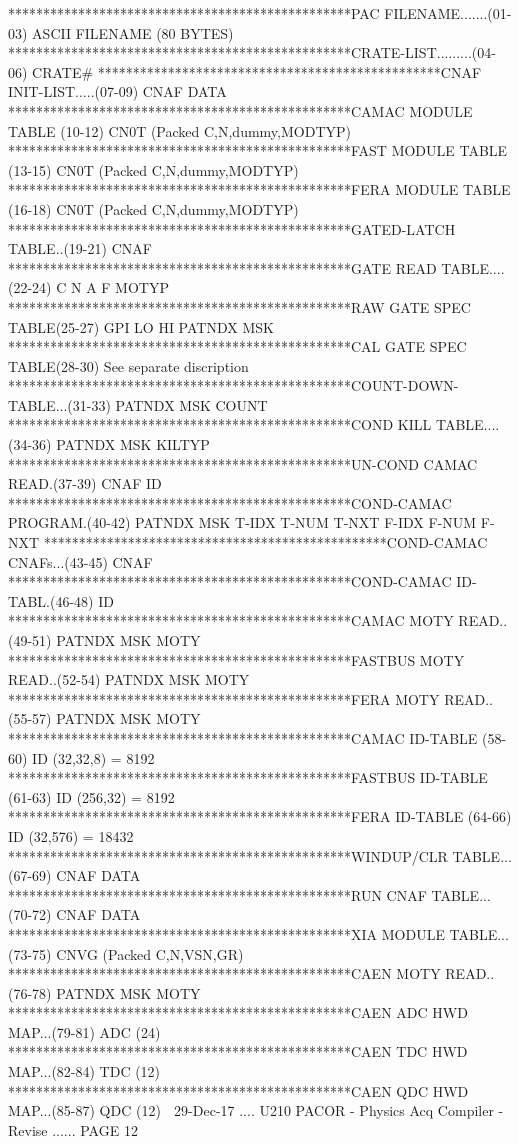    *************************************************PAC FILENAME.......(01-03)
   ASCII FILENAME (80 BYTES)
   *************************************************CRATE-LIST.........(04-06)
   CRATE#
   *************************************************CNAF INIT-LIST.....(07-09)
   CNAF DATA
   *************************************************CAMAC MODULE TABLE (10-12)
   CN0T           (Packed C,N,dummy,MODTYP)
   *************************************************FAST  MODULE TABLE (13-15)
   CN0T           (Packed C,N,dummy,MODTYP)
   *************************************************FERA  MODULE TABLE (16-18)
   CN0T           (Packed C,N,dummy,MODTYP)
   *************************************************GATED-LATCH TABLE..(19-21)
   CNAF
   *************************************************GATE READ TABLE....(22-24)
   C N A F MOTYP
   *************************************************RAW GATE SPEC TABLE(25-27)
   GPI LO HI PATNDX MSK
   *************************************************CAL GATE SPEC TABLE(28-30)
   See separate discription
   *************************************************COUNT-DOWN-TABLE...(31-33)
   PATNDX MSK COUNT
   *************************************************COND KILL TABLE....(34-36)
   PATNDX MSK KILTYP
   *************************************************UN-COND CAMAC READ.(37-39)
   CNAF   ID
   *************************************************COND-CAMAC PROGRAM.(40-42)
   PATNDX MSK T-IDX T-NUM T-NXT F-IDX F-NUM F-NXT
   *************************************************COND-CAMAC CNAFs...(43-45)
   CNAF
   *************************************************COND-CAMAC ID-TABL.(46-48)
   ID
   *************************************************CAMAC   MOTY READ..(49-51)
   PATNDX MSK MOTY
   *************************************************FASTBUS MOTY READ..(52-54)
   PATNDX MSK MOTY
   *************************************************FERA    MOTY READ..(55-57)
   PATNDX MSK MOTY
   *************************************************CAMAC     ID-TABLE (58-60)
   ID (32,32,8) = 8192
   *************************************************FASTBUS   ID-TABLE (61-63)
   ID (256,32)  = 8192
   *************************************************FERA      ID-TABLE (64-66)
   ID (32,576)  = 18432
   *************************************************WINDUP/CLR TABLE...(67-69)
   CNAF DATA
   *************************************************RUN CNAF   TABLE...(70-72)
   CNAF DATA
   *************************************************XIA MODULE TABLE...(73-75)
   CNVG           (Packed C,N,VSN,GR)
   *************************************************CAEN    MOTY READ..(76-78)
   PATNDX MSK MOTY
   *************************************************CAEN ADC HWD MAP...(79-81)
   ADC (24)
   *************************************************CAEN TDC HWD MAP...(82-84)
   TDC (12)
   *************************************************CAEN QDC HWD MAP...(85-87)
   QDC (12)
    
   29-Dec-17 .... U210  PACOR -  Physics Acq Compiler - Revise ...... PAGE  12
 
